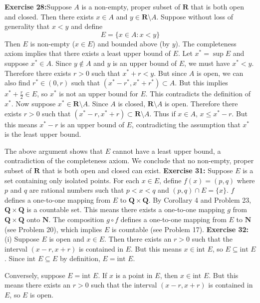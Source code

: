 \textbf{Exercise 28:}Suppose $A$ is a non-empty, proper subset of $\mathbf{R}$ that is both open and closed. Then there exists $x \in A$ and $y \in \mathbf{R} \setminus A$. Suppose without loss of generality that $x < y$ and define
\[ E = \{ x \in A : x < y \} \]
Then $E$ is non-empty ($x \in E$) and bounded above (by $y$). The completeness axiom implies that there exists a least upper bound of $E$. Let $x^* = \sup E$ and suppose $x^* \in A$. Since $y \notin A$ and $y$ is an upper bound of $E$, we must have $x^* < y$. Therefore there exists $r > 0$ such that $x^* + r < y$. But since $A$ is open, we can also find $r^* \in (0, r)$ such that $(x^* - r^*, x^* + r^*) \subset A$. But this implies $x^* + \frac{r}{2} \in E$, so $x^*$ is not an upper bound for $E$. This contradicts the definition of $x^*$. Now suppose $x^* \in \mathbf{R} \setminus A$. Since $A$ is closed, $\mathbf{R} \setminus A$ is open. Therefore there exists $r > 0$ such that $(x^* - r, x^* + r) \subset \mathbf{R} \setminus A$. Thus if $x \in A$, $x \le x^* - r$. But this means $x^* - r$ is an upper bound of $E$, contradicting the assumption that $x^*$ is the least upper bound.

The above argument shows that $E$ cannot have a least upper bound, a contradiction of the completeness axiom. We conclude that no non-empty, proper subset of $\mathbf{R}$ that is both open and closed can exist.
\textbf{Exercise 31:}
Suppose $E$ is a set containing only isolated points. For each $x \in E$, define $f(x) = (p,q)$ where $p$ and $q$ are rational numbers such that $p < x < q$ and $(p,q) \cap E = \{x\}$. $f$ defines a one-to-one mapping from $E$ to $\mathbf{Q} \times \mathbf{Q}$. By Corollary 4 and Problem 23, $\mathbf{Q} \times \mathbf{Q}$ is a countable set. This means there exists a one-to-one mapping $g$ from $\mathbf{Q} \times \mathbf{Q}$ onto $\mathbf{N}$. The composition $g \circ f$ defines a one-to-one mapping from $E$ to $\mathbf{N}$ (see Problem 20), which implies $E$ is countable (see Problem 17).
\textbf{Exercise 32:}
(i) Suppose $E$ is open and $x \in E$. Then there exists an $r > 0$ such that the interval $(x-r, x+r)$ is contained in $E$. But this means $x \in \text{int } E$, so $E \subseteq \text{int } E$. Since $\text{int } E \subseteq E$ by definition, $E = \text{int } E$.

Conversely, suppose $E = \text{int } E$. If $x$ is a point in $E$, then $x \in \text{int } E$. But this means there exists an $r > 0$ such that the interval $(x-r, x+r)$ is contained in $E$, so $E$ is open.

